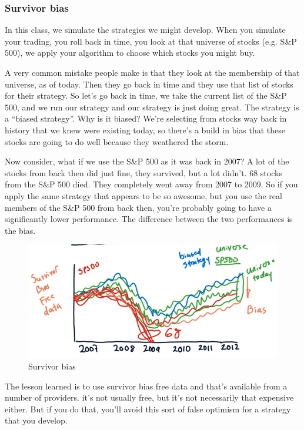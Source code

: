 \documentclass[12pt]{article}
\newcommand{\q}[1]{``#1''}
\begin{document}
\subsubsection{Survivor bias}

In this class, we simulate the strategies we might develop. When you simulate your trading, you roll back in time, you look at that universe of stocks (e.g. S\&P 500), we apply your algorithm to choose which stocks you might buy. 

A very common mistake people make is that they look at the membership of that universe, as of today. Then they go back in time and they use that list of stocks for their strategy. So let's go back in time, we take the current list of the S\&P 500, and we run our strategy and our strategy is just doing great. The strategy is a \q{biased strategy}. Why is it biased? We're selecting from stocks way back in history that we knew were existing today, so there's a build in bias that these stocks are going to do well because they weathered the storm. 

Now consider, what if we use the S\&P 500 as it was back in 2007? A lot of the stocks from back then did just fine, they survived, but a lot didn't. 68 stocks from the S\&P 500 died. They completely went away from 2007 to 2009. So if you apply the same strategy that appears to be so awesome, but you use the real members of the S\&P 500 from back then, you're probably going to have a significantly lower performance. The difference between the two performances is the bias.

\begin{figure}[!ht]
\centering
\includegraphics[scale=0.45]{fig/fig54}
\caption{Survivor bias}
\end{figure}

The lesson learned is to use survivor bias free data and that's available from a number of providers. it's not usually free, but it's not necessarily that expensive either. But if you do that, you'll avoid this sort of false optimism for a strategy that you develop. 
\end{document}
